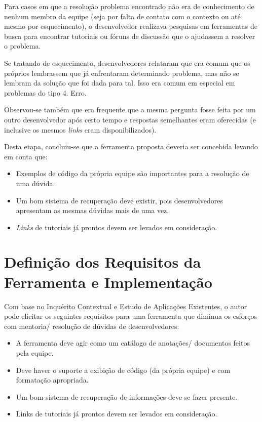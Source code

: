 Para casos em que a resolução problema encontrado não era de conhecimento de nenhum membro da equipe (seja por falta de contato com o contexto ou até mesmo por esquecimento), o desenvolvedor realizava pesquisas em ferramentas de busca para encontrar tutoriais ou fóruns de discussão que o ajudassem a resolver o problema.

Se tratando de esquecimento, desenvolvedores relataram que era comum que os próprios lembrassem que já enfrentaram determinado problema, mas não se lembram da solução que foi dada para tal. Isso era comum em especial em problemas do tipo 4. Erro.

Observou-se também que era frequente que a mesma pergunta fosse feita por um outro desenvolvedor após certo tempo e respostas semelhantes eram oferecidas (e inclusive os mesmos \textit{links} eram disponibilizados).

Desta etapa, concluiu-se que a ferramenta proposta deveria ser concebida levando em conta que:

\begin{itemize}
  \item Exemplos de código da própria equipe são importantes para a resolução de uma dúvida.
  \item Um bom sistema de recuperação deve existir, pois desenvolvedores apresentam as mesmas dúvidas mais de uma vez.
  \item \textit{Links} de tutoriais já prontos devem ser levados em consideração.
\end{itemize}

\section{Definição dos Requisitos da Ferramenta e Implementação}

Com base no Inquérito Contextual e Estudo de Aplicações Existentes, o autor pode elicitar os seguintes requisitos para uma ferramenta que diminua os esforços com mentoria/ resolução de dúvidas de desenvolvedores:

\begin{itemize}
  \item A ferramenta deve agir como um catálogo de anotações/ documentos feitos pela equipe.
  \item Deve haver o suporte a exibição de código (da própria equipe) e com formatação apropriada.
  \item Um bom sistema de recuperação de informações deve se fazer presente.
  \item Links de tutoriais já prontos devem ser levados em consideração.
\end{itemize}

